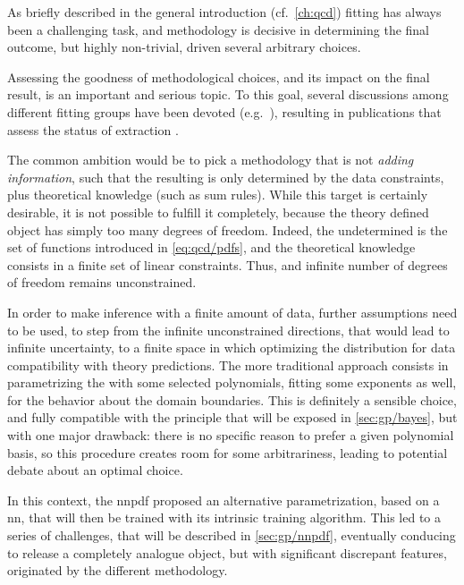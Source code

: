 
As briefly described in the general introduction (cf.\ \cref{ch:qcd}) \pdf
fitting has always been a challenging task, and methodology is decisive in
determining the final outcome, but highly non-trivial, driven several arbitrary
choices.

Assessing the goodness of methodological choices, and its impact on the final
result, is an important and serious topic.
To this goal, several discussions among different \pdf fitting groups have been
devoted (e.g.\ \cite{DeRoeck:2009zz}), resulting in publications that assess the
status of \pdf extraction
\cite{Alekhin:2011sk,Botje:2011sn,Rojo:2016ymp,PDF4LHCWorkingGroup:2022cjn}.

The common ambition would be to pick a methodology that is not \textit{adding
information}, such that the resulting \pdf is only determined by the data
constraints, plus theoretical knowledge (such as sum rules).
%
While this target is certainly desirable, it is not possible to fulfill it
completely, because the theory defined object has simply too many degrees of
freedom.
%
Indeed, the undetermined \pdf is the set of functions introduced in
\cref{eq:qcd/pdfs}, and the theoretical knowledge consists in a finite set of
linear constraints.
Thus, and infinite number of degrees of freedom remains unconstrained.

In order to make inference with a finite amount of data, further assumptions
need to be used, to step from the infinite unconstrained directions, that would
lead to infinite uncertainty, to a finite space in which optimizing the \pdfs
distribution for data compatibility with theory predictions.
%
The more traditional approach consists in parametrizing the \pdfs with some
selected polynomials, fitting some exponents as well, for the behavior about
the domain boundaries.
%
This is definitely a sensible choice, and fully compatible with the principle
that will be exposed in \cref{sec:gp/bayes}, but with one major drawback: there
is no specific reason to prefer a given polynomial basis, so this procedure
creates room for some arbitrariness, leading to potential debate about an
optimal choice.

In this context, the \acrlong{nnpdf} proposed an alternative \pdf
parametrization, based on a \acrfull{nn}, that will then be trained with its
intrinsic training algorithm.
%
This led to a series of challenges, that will be described in
\cref{sec:gp/nnpdf}, eventually conducing to release a completely analogue
object, but with significant discrepant features, originated by the different
methodology.

